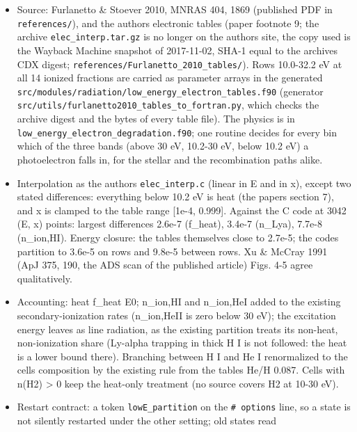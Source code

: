 \documentclass[english,a4paper]{my_memo}
\providecommand{\tightlist}{\setlength{\itemsep}{0pt}\setlength{\parskip}{0pt}}
\begin{document}
\begin{itemize}
\tightlist
\item
  Source: Furlanetto \& Stoever 2010, MNRAS 404, 1869 (published PDF in
  \texttt{references/}), and the authors\textquotesingle{} electronic tables (paper footnote 9;
  the archive \texttt{elec\_interp.tar.gz} is no longer on the authors\textquotesingle{} site, the
  copy used is the Wayback Machine snapshot of 2017-11-02, SHA-1 equal to
  the archive\textquotesingle s CDX digest; \texttt{references/Furlanetto\_2010\_tables/}). Rows
  10.0-32.2 eV at all 14 ionized fractions are carried as parameter arrays in
  the generated \texttt{src/modules/radiation/low\_energy\_electron\_tables.f90}
  (generator \texttt{src/utils/furlanetto2010\_tables\_to\_fortran.py}, which checks
  the archive digest and the bytes of every table file). The physics is in
  \texttt{low\_energy\_electron\_degradation.f90}; one routine decides for every bin
  which of the three bands (above 30 eV, 10.2-30 eV, below 10.2 eV) a
  photoelectron falls in, for the stellar and the recombination paths
  alike.
\item
  Interpolation as the authors\textquotesingle{} \texttt{elec\_interp.c} (linear in E and in x),
  except two stated differences: everything below 10.2 eV is heat (the
  paper\textquotesingle s section 7), and x is clamped to the table range {[}1e-4, 0.999{]}.
  Against the C code at 3042 (E, x) points: largest differences 2.6e-7
  (f\_heat), 3.4e-7 (n\_Lya), 7.7e-8 (n\_ion,HI). Energy closure: the tables
  themselves close to 2.7e-5; the code\textquotesingle s partition to 3.6e-5 on rows and
  9.8e-5 between rows. Xu \& McCray 1991 (ApJ 375, 190, the ADS scan of the
  published article) Figs. 4-5 agree qualitatively.
\item
  Accounting: heat f\_heat E0; n\_ion,HI and n\_ion,HeI added to the existing
  secondary-ionization rates (n\_ion,HeII is zero below 30 eV); the
  excitation energy leaves as line radiation, as the existing partition
  treats its non-heat, non-ionization share (Ly-alpha trapping in thick
  H I is not followed: the heat is a lower bound there). Branching between
  H I and He I renormalized to the cell\textquotesingle s composition by the existing rule
  from the tables\textquotesingle{} He/H 0.087. Cells with n(H2) \textgreater{} 0 keep the heat-only
  treatment (no source covers H2 at 10-30 eV).
\item
  Restart contract: a token \texttt{lowE\_partition} on the \texttt{\#\ options} line, so a
  state is not silently restarted under the other setting; old states read

\end{itemize}
\end{document}
